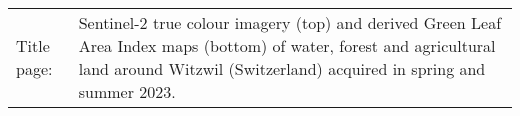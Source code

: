 \thispagestyle{empty}
\vspace*{\fill}

\begin{flushleft}
    
    \begin{tabularx}{\textwidth}{lX}
    Title page:  & Sentinel-2 true colour imagery (top) and derived Green Leaf Area Index maps (bottom) of water, forest and agricultural land around Witzwil (Switzerland) acquired in spring and summer 2023. \\
    \end{tabularx}

\end{flushleft}
